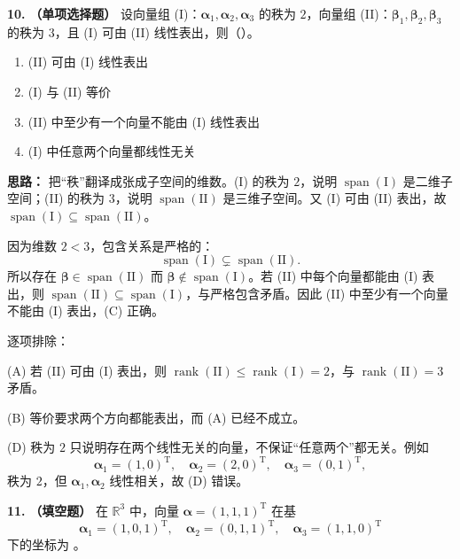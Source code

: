 \textbf{10.} \textbf{（单项选择题）} 设向量组 (I)：$\boldsymbol{\alpha}_1,\boldsymbol{\alpha}_2,\boldsymbol{\alpha}_3$ 的秩为 $2$，向量组 (II)：$\boldsymbol{\beta}_1,\boldsymbol{\beta}_2,\boldsymbol{\beta}_3$ 的秩为 $3$，且 (I) 可由 (II) 线性表出，则（\quad）。
\begin{enumerate}[label=(\Alph*)]
    \item (II) 可由 (I) 线性表出
    \item (I) 与 (II) 等价
    \item (II) 中至少有一个向量不能由 (I) 线性表出
    \item (I) 中任意两个向量都线性无关
\end{enumerate}

\ifshowsolutions%
\quad
\textbf{思路：} 把“秩”翻译成张成子空间的维数。(I) 的秩为 $2$，说明 $\operatorname{span}(\mathrm{I})$ 是二维子空间；(II) 的秩为 $3$，说明 $\operatorname{span}(\mathrm{II})$ 是三维子空间。又 (I) 可由 (II) 表出，故 $\operatorname{span}(\mathrm{I})\subseteq\operatorname{span}(\mathrm{II})$。

因为维数 $2<3$，包含关系是严格的：
\[
\operatorname{span}(\mathrm{I})\subsetneq \operatorname{span}(\mathrm{II}).
\]
所以存在 $\boldsymbol{\beta}\in\operatorname{span}(\mathrm{II})$ 而 $\boldsymbol{\beta}\notin\operatorname{span}(\mathrm{I})$。若 (II) 中每个向量都能由 (I) 表出，则 $\operatorname{span}(\mathrm{II})\subseteq\operatorname{span}(\mathrm{I})$，与严格包含矛盾。因此 (II) 中至少有一个向量不能由 (I) 表出，(C) 正确。

逐项排除：

(A) 若 (II) 可由 (I) 表出，则 $\operatorname{rank}(\mathrm{II})\leq\operatorname{rank}(\mathrm{I})=2$，与 $\operatorname{rank}(\mathrm{II})=3$ 矛盾。

(B) 等价要求两个方向都能表出，而 (A) 已经不成立。

(D) 秩为 $2$ 只说明存在两个线性无关的向量，不保证“任意两个”都无关。例如
\[
\boldsymbol{\alpha}_1=(1,0)^\mathrm{T},\quad
\boldsymbol{\alpha}_2=(2,0)^\mathrm{T},\quad
\boldsymbol{\alpha}_3=(0,1)^\mathrm{T},
\]
秩为 $2$，但 $\boldsymbol{\alpha}_1,\boldsymbol{\alpha}_2$ 线性相关，故 (D) 错误。

\else \answerarea[8] \fi%

\textbf{11.} \textbf{（填空题）} 在 $\mathbb{R}^3$ 中，向量 $\boldsymbol{\alpha}=(1,1,1)^\mathrm{T}$ 在基
\[
\boldsymbol{\alpha}_1=(1,0,1)^\mathrm{T},\quad
\boldsymbol{\alpha}_2=(0,1,1)^\mathrm{T},\quad
\boldsymbol{\alpha}_3=(1,1,0)^\mathrm{T}
\]
下的坐标为 \underline{\qquad}。


